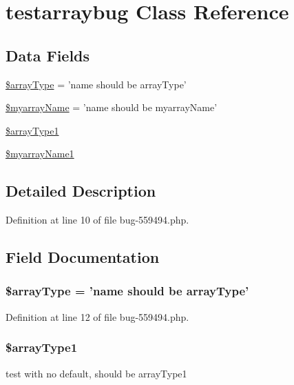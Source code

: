 \hypertarget{classtestarraybug}{\section{testarraybug \-Class \-Reference}
\label{classtestarraybug}
}
\subsection*{\-Data \-Fields}
\begin{DoxyCompactItemize}
\item 
\hyperlink{classtestarraybug_a591c2e5f16a7d15001c8451914346df3}{\$array\-Type} = 'name should be array\-Type'
\item 
\hyperlink{classtestarraybug_a4d70d28292a242d6a4152e6c62391f21}{\$myarray\-Name} = 'name should be myarray\-Name'
\item 
\hyperlink{classtestarraybug_a6a9881c45140e03ecf1318aeef6e608f}{\$array\-Type1}
\item 
\hyperlink{classtestarraybug_a4290291905bf25ee1cd86d828d314ee4}{\$myarray\-Name1}
\end{DoxyCompactItemize}


\subsection{\-Detailed \-Description}


\-Definition at line 10 of file bug-\/559494.\-php.



\subsection{\-Field \-Documentation}
\hypertarget{classtestarraybug_a591c2e5f16a7d15001c8451914346df3}{
\subsubsection[{\$array\-Type}]{\setlength{\rightskip}{0pt plus 5cm}\$array\-Type = 'name should be array\-Type'}}\label{classtestarraybug_a591c2e5f16a7d15001c8451914346df3}


\-Definition at line 12 of file bug-\/559494.\-php.

\hypertarget{classtestarraybug_a6a9881c45140e03ecf1318aeef6e608f}{
\subsubsection[{\$array\-Type1}]{\setlength{\rightskip}{0pt plus 5cm}\$array\-Type1}}\label{classtestarraybug_a6a9881c45140e03ecf1318aeef6e608f}
test with no default, should be array\-Type1 

